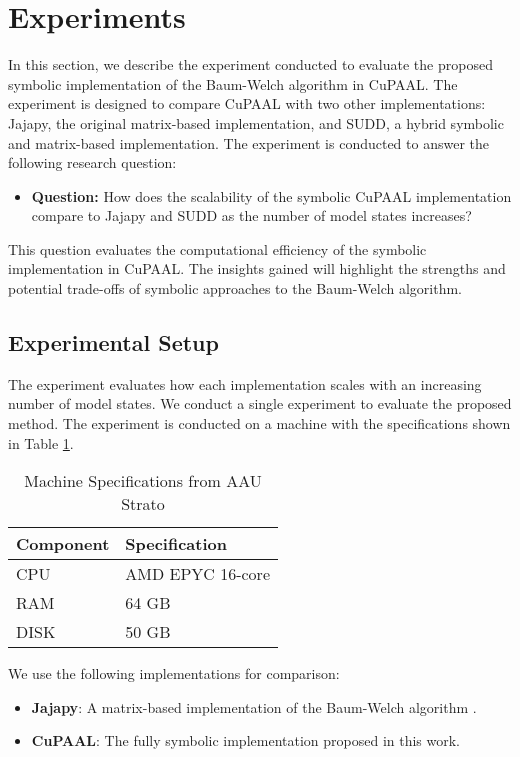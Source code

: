 \section{Experiments}\label{sec:experiments}
In this section, we describe the experiment conducted to evaluate the proposed symbolic implementation of the Baum-Welch algorithm in CuPAAL.
The experiment is designed to compare CuPAAL with two other implementations: Jajapy, the original matrix-based implementation, and SUDD, a hybrid symbolic and matrix-based implementation.
The experiment is conducted to answer the following research question:

\begin{itemize}
\item \textbf{Question:} How does the scalability of the symbolic CuPAAL implementation compare to Jajapy and SUDD as the number of model states increases?
\end{itemize}

This question evaluates the computational efficiency of the symbolic implementation in CuPAAL. The insights gained will highlight the strengths and potential trade-offs of symbolic approaches to the Baum-Welch algorithm.

\subsection{Experimental Setup}
The experiment evaluates how each implementation scales with an increasing number of model states. We conduct a single experiment to evaluate the proposed method.
The experiment is conducted on a machine with the specifications shown in Table \ref{tab:machine-specs}. 
\begin{table}
\centering
\caption{Machine Specifications from AAU Strato}
\label{tab:machine-specs}
    \begin{tabular}{ll}
        \toprule
        \textbf{Component} & \textbf{Specification} \\
        \midrule
        CPU & AMD EPYC 16-core \\
        RAM & 64 GB \\
        DISK & 50 GB \\
        \bottomrule
    \end{tabular}
\end{table}

We use the following implementations for comparison:

\begin{itemize}
\item \textbf{Jajapy}: A matrix-based implementation of the Baum-Welch algorithm \cite{reynouard2023jajapy}.
\item \textbf{CuPAAL}: The fully symbolic implementation proposed in this work.
\end{itemize}


